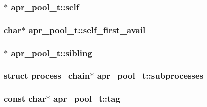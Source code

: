 \subsubsection[{\texorpdfstring{self}{self}}]{$\ast$ apr\+\_\+pool\+\_\+t\+::self}\hypertarget{structapr__pool__t_aa742b251c8799d886709246ab1cafc53}{}\label{structapr__pool__t_aa742b251c8799d886709246ab1cafc53}
\subsubsection[{\texorpdfstring{self\+\_\+first\+\_\+avail}{self_first_avail}}]{\setlength{\rightskip}{0pt plus 5cm}char$\ast$ apr\+\_\+pool\+\_\+t\+::self\+\_\+first\+\_\+avail}\hypertarget{structapr__pool__t_abe113f61048164e90b17bb0b456e3900}{}\label{structapr__pool__t_abe113f61048164e90b17bb0b456e3900}
\subsubsection[{\texorpdfstring{sibling}{sibling}}]{$\ast$ apr\+\_\+pool\+\_\+t\+::sibling}\hypertarget{structapr__pool__t_adb7173775273b72cdbd1c7890ca6f5cb}{}\label{structapr__pool__t_adb7173775273b72cdbd1c7890ca6f5cb}
\subsubsection[{\texorpdfstring{subprocesses}{subprocesses}}]{\setlength{\rightskip}{0pt plus 5cm}struct {\bf process\+\_\+chain}$\ast$ apr\+\_\+pool\+\_\+t\+::subprocesses}\hypertarget{structapr__pool__t_aedc6fb98956f528445d370f72b5fcbd1}{}\label{structapr__pool__t_aedc6fb98956f528445d370f72b5fcbd1}
\subsubsection[{\texorpdfstring{tag}{tag}}]{\setlength{\rightskip}{0pt plus 5cm}const char$\ast$ apr\+\_\+pool\+\_\+t\+::tag}\hypertarget{structapr__pool__t_a20079f6dcd17e1e15199c919f56c1b46}{}\label{structapr__pool__t_a20079f6dcd17e1e15199c919f56c1b46}
